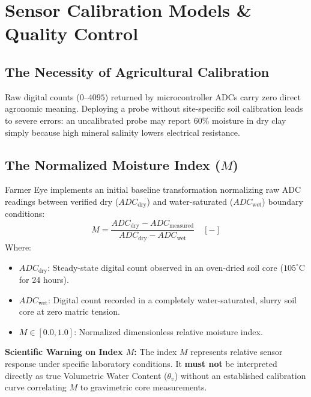 \documentclass[11pt,a4paper,oneside]{report}
\begin{document}
\chapter{Sensor Calibration Models \& Quality Control}

\section{The Necessity of Agricultural Calibration}
Raw digital counts ($0–4095$) returned by microcontroller ADCs carry zero direct agronomic meaning. Deploying a probe without site-specific soil calibration leads to severe errors: an uncalibrated probe may report 60\% moisture in dry clay simply because high mineral salinity lowers electrical resistance.

\section{The Normalized Moisture Index ($M$)}
Farmer Eye implements an initial baseline transformation normalizing raw ADC readings between verified dry ($ADC_{\text{dry}}$) and water-saturated ($ADC_{\text{wet}}$) boundary conditions:
\begin{equation}
M = \frac{ADC_{\text{dry}} - ADC_{\text{measured}}}{ADC_{\text{dry}} - ADC_{\text{wet}}} \quad [-]
\end{equation}
Where:
\begin{itemize}[leftmargin=*]
    \item $ADC_{\text{dry}}$: Steady-state digital count observed in an oven-dried soil core ($105^\circ\text{C}$ for 24 hours).
    \item $ADC_{\text{wet}}$: Digital count recorded in a completely water-saturated, slurry soil core at zero matric tension.
    \item $M \in [0.0, 1.0]$: Normalized dimensionless relative moisture index.
\end{itemize}

\begin{warningbox}
\textbf{Scientific Warning on Index $M$:} The index $M$ represents relative sensor response under specific laboratory conditions. It \textbf{must not} be interpreted directly as true Volumetric Water Content ($\theta_v$) without an established calibration curve correlating $M$ to gravimetric core measurements.
\end{warningbox}
\end{document}
